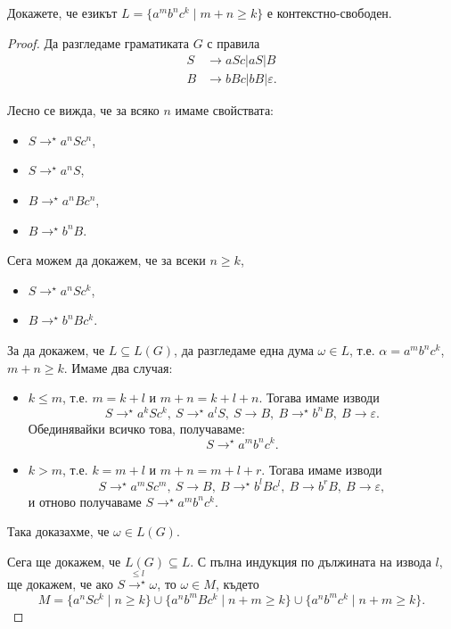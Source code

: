 \begin{prb}
  Докажете, че езикът $L = \{a^mb^nc^k\mid m+n \geq k\}$ е
  контекстно-свободен.
\end{prb}
\begin{proof}
  Да разгледаме граматиката $G$ с правила
  \begin{align*}
    S& \rightarrow aSc\vert aS \vert B\\
    B& \rightarrow bBc\vert bB\vert\varepsilon.
  \end{align*}
  
  Лесно се вижда, че за всяко $n$ имаме свойствата:
  \begin{itemize}
  \item 
    $S \rightarrow^\star a^nSc^n$,
  \item
    $S \rightarrow^\star a^nS$,
  \item
    $B \rightarrow^\star a^nBc^n$,
  \item
    $B \rightarrow^\star b^nB$.
  \end{itemize}
  Сега можем да докажем, че за всеки $n \geq k$,
  \begin{itemize}
  \item 
    $S \rightarrow^\star a^nSc^k$,
  \item
    $B \rightarrow^\star b^nBc^k$.
  \end{itemize}
  За да докажем, че $L \subseteq L(G)$, 
  да разгледаме една дума $\omega \in L$, т.е. $\alpha = a^mb^nc^k$, $m+n \geq k$.
  Имаме два случая:
  \begin{itemize}
  \item 
    $k \leq m$, т.е. $m = k+l$ и $m+n = k+l+n$.
    Тогава имаме изводи
    \[S \rightarrow^\star a^kSc^k,\ S \rightarrow^\star a^lS,\ S \rightarrow B,\ B \rightarrow^\star b^nB,\ B \rightarrow \varepsilon.\]
    Обединявайки всичко това, получаваме:
    \[S \rightarrow^\star a^mb^nc^k.\]
  \item
    $k > m$, т.е. $k = m+l$ и $m+n = m+l+r$.
    Тогава имаме изводи
    \[S \rightarrow^\star a^mSc^m,\ S\rightarrow B,\ B\rightarrow^\star b^lBc^l,\ B\rightarrow b^rB,\ B\rightarrow\varepsilon,\]
    и отново получаваме $S \rightarrow^\star a^mb^nc^k$.
  \end{itemize}
  Така доказахме, че $\omega \in L(G)$.
  
  Сега ще докажем, че $L(G) \subseteq L$.
  С пълна индукция по дължината на извода $l$,
  ще докажем, че ако $S \stackrel{\leq l}{\rightarrow^\star}\omega$, то $\omega \in M$, където
  \[M = \{a^nSc^k\mid n\geq k\}\cup\{a^nb^mBc^k\mid n+m\geq k\}\cup\{a^nb^mc^k\mid n+m\geq k\}.\]
  

\end{proof}
